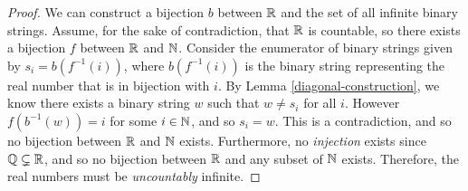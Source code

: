 \begin{proof}
    We can construct a bijection $b$ between $\mathbb{R}$ and the set of all infinite binary strings. Assume, for the sake of contradiction, that $\mathbb{R}$ is countable, so there exists a bijection $f$ between $\mathbb{R}$ and $\mathbb{N}$. Consider the enumerator of binary strings given by $s_{i} = b(f^{-1}(i))$, where $b(f^{-1}(i))$ is the binary string representing the real number that is in bijection with $i$. By Lemma \ref{diagonal-construction}, we know there exists a binary string $w$ such that $w \neq s_i$ for all $i$. However $f(b^{-1}(w)) = i$ for some $i \in \mathbb{N}$, and so $s_i = w$. This is a contradiction, and so no bijection between $\mathbb{R}$ and $\mathbb{N}$ exists. Furthermore, no \emph{injection} exists since $\mathbb{Q} \subsetneq \mathbb{R}$, and so no bijection between $\mathbb{R}$ and any subset of $\mathbb{N}$ exists. Therefore, the real numbers must be \emph{uncountably} infinite.
\end{proof}
